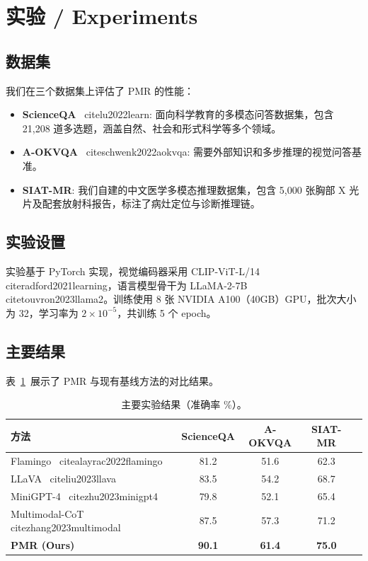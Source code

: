 \section{实验 / Experiments}\label{sec:experiments}

\subsection{数据集}

我们在三个数据集上评估了 PMR 的性能：
\begin{itemize}
  \item \textbf{ScienceQA}~
cite{lu2022learn}: 面向科学教育的多模态问答数据集，包含 21,208 道多选题，涵盖自然、社会和形式科学等多个领域。
  \item \textbf{A-OKVQA}~
cite{schwenk2022aokvqa}: 需要外部知识和多步推理的视觉问答基准。
  \item \textbf{SIAT-MR}: 我们自建的中文医学多模态推理数据集，包含 5,000 张胸部 X 光片及配套放射科报告，标注了病灶定位与诊断推理链。
\end{itemize}

\subsection{实验设置}

实验基于 PyTorch 实现，视觉编码器采用 CLIP-ViT-L/14~
cite{radford2021learning}，语言模型骨干为 LLaMA-2-7B~
cite{touvron2023llama2}。训练使用 8 张 NVIDIA A100（40GB）GPU，批次大小为 32，学习率为 $2 \times 10^{-5}$，共训练 5 个 epoch。

\subsection{主要结果}

表~\ref{tab:main-results}~展示了 PMR 与现有基线方法的对比结果。

\begin{table}[htbp]
  \centering
  \caption{主要实验结果（准确率 \%）。}
  \label{tab:main-results}
  \begin{tabular}{lcccc}
    \toprule
    \textbf{方法} & \textbf{ScienceQA} & \textbf{A-OKVQA} & \textbf{SIAT-MR} \\
    \midrule
    Flamingo~
cite{alayrac2022flamingo} & 81.2 & 51.6 & 62.3 \\
    LLaVA~
cite{liu2023llava} & 83.5 & 54.2 & 68.7 \\
    MiniGPT-4~
cite{zhu2023minigpt4} & 79.8 & 52.1 & 65.4 \\
    Multimodal-CoT~
cite{zhang2023multimodal} & 87.5 & 57.3 & 71.2 \\
    \midrule
    \textbf{PMR (Ours)} & \textbf{90.1} & \textbf{61.4} & \textbf{75.0} \\
    \bottomrule
  \end{tabular}
\end{table}

